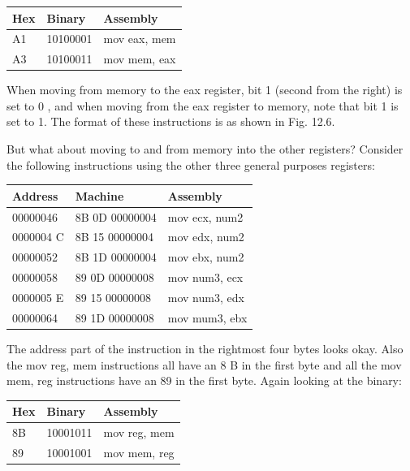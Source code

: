 \documentclass[10pt]{book}
\begin{document}
\begin{center}
\begin{center}
\begin{center}
\begin{center}
\begin{center}
\begin{center}
\begin{tabular}{|l|l|l|}
\hline
Hex & Binary & Assembly \\
\hline
A1 & 10100001 & mov eax, mem \\
\hline
A3 & 10100011 & mov mem, eax \\
\hline
\end{tabular}
\end{center}

When moving from memory to the eax register, bit 1 (second from the right) is set to 0 , and when moving from the eax register to memory, note that bit 1 is set to 1. The format of these instructions is as shown in Fig. 12.6.

But what about moving to and from memory into the other registers? Consider the following instructions using the other three general purposes registers:

\begin{center}
\begin{tabular}{|l|l|l|}
\hline
Address & Machine & Assembly \\
\hline
00000046 & 8B 0D 00000004 & mov ecx, num2 \\
\hline
0000004 C & 8B 15 00000004 & mov edx, num2 \\
\hline
00000052 & 8B 1D 00000004 & mov ebx, num2 \\
\hline
00000058 & 89 0D 00000008 & mov num3, ecx \\
\hline
0000005 E & 89 15 00000008 & mov num3, edx \\
\hline
00000064 & 89 1D 00000008 & mov mum3, ebx \\
\hline
\end{tabular}
\end{center}

The address part of the instruction in the rightmost four bytes looks okay. Also the mov reg, mem instructions all have an 8 B in the first byte and all the mov mem, reg instructions have an 89 in the first byte. Again looking at the binary:

\begin{center}
\begin{tabular}{|l|l|l|}
\hline
Hex & Binary & Assembly \\
\hline
8B & 10001011 & mov reg, mem \\
\hline
89 & 10001001 & mov mem, reg \\
\hline
\end{tabular}
\end{center}


\end{center}
\end{center}
\end{center}
\end{center}
\end{center}
\end{document}
